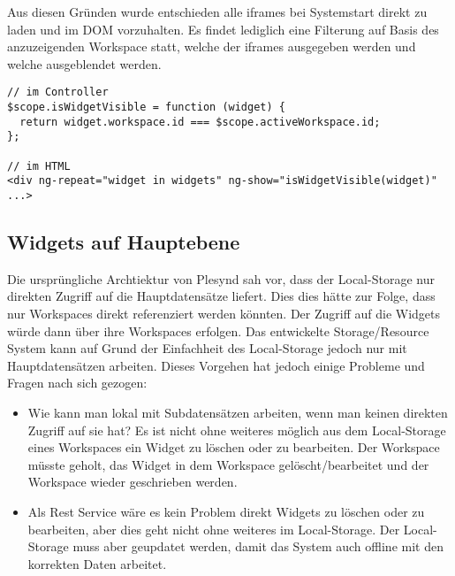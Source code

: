 Aus diesen Gründen wurde entschieden alle iframes bei Systemstart direkt zu laden und im DOM vorzuhalten. Es findet lediglich eine Filterung auf Basis des anzuzeigenden Workspace statt, welche der iframes ausgegeben werden und welche ausgeblendet werden.
\begin{lstlisting}
// im Controller
$scope.isWidgetVisible = function (widget) {
  return widget.workspace.id === $scope.activeWorkspace.id;
};

// im HTML
<div ng-repeat="widget in widgets" ng-show="isWidgetVisible(widget)" ...>
\end{lstlisting}

\subsection{Widgets auf Hauptebene}
Die ursprüngliche Archtiektur von Plesynd sah vor, dass der Local-Storage nur direkten Zugriff auf die Hauptdatensätze liefert. Dies dies hätte zur Folge, dass nur Workspaces direkt referenziert werden könnten. Der Zugriff auf die Widgets würde dann über ihre Workspaces erfolgen. Das entwickelte Storage/Resource System kann auf Grund der Einfachheit des Local-Storage jedoch nur mit Hauptdatensätzen arbeiten. Dieses Vorgehen hat jedoch einige Probleme und Fragen nach sich gezogen: 
\begin{itemize}
 \item Wie kann man lokal mit Subdatensätzen arbeiten, wenn man keinen direkten Zugriff auf sie hat? Es ist nicht ohne weiteres möglich aus dem Local-Storage eines Workspaces ein Widget zu löschen oder zu bearbeiten. Der Workspace müsste geholt, das Widget in dem Workspace gelöscht/bearbeitet und der Workspace wieder geschrieben werden. 
 \item Als Rest Service wäre es kein Problem direkt Widgets zu löschen oder zu bearbeiten, aber dies geht nicht ohne weiteres im Local-Storage. Der Local-Storage muss aber geupdatet werden, damit das System auch offline mit den korrekten Daten arbeitet.
\end{itemize} 

